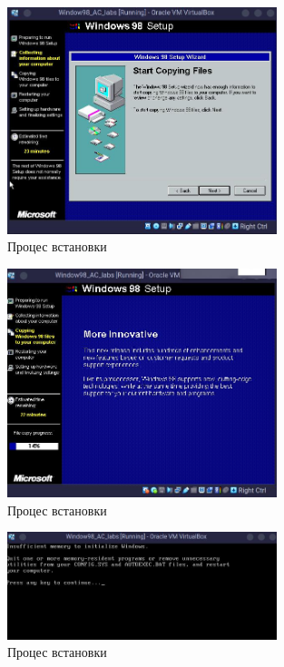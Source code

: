 \begin{figure}[h]
    \centering
    \includegraphics[width=0.7\textwidth]{reports/AC/lab1/assets/12.jpeg}
    \caption{Процес встановки}
\end{figure}

\begin{figure}[h]
    \centering
    \includegraphics[width=0.7\textwidth]{reports/AC/lab1/assets/14.jpeg}
    \caption{Процес встановки}
\end{figure}

\begin{figure}[h]
    \centering
    \includegraphics[width=0.7\textwidth]{reports/AC/lab1/assets/15.jpeg}
    \caption{Процес встановки}
\end{figure}

